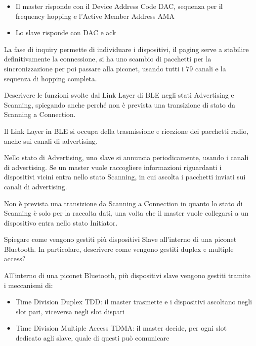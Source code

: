 \begin{questions}
\begin{solution}
\begin{itemize}
            \item Il master risponde con il Device Address Code DAC, sequenza per il frequency hopping e l'Active Member Address AMA
            
            \item Lo slave risponde con DAC e ack
        \end{itemize}
        
        La fase di inquiry permette di individuare i dispositivi, il paging serve a stabilire definitivamente la connessione, si ha uno scambio di pacchetti per la sincronizzazione per poi passare alla piconet, usando tutti i 79 canali e la sequenza di hopping completa.
    \end{solution}
    
    \question Descrivere le funzioni svolte dal Link Layer di BLE negli stati Advertising e Scanning, spiegando anche perché non è prevista una transizione di stato da Scanning a Connection.
    
    \begin{solution}
        Il Link Layer in BLE si occupa della trasmissione e ricezione dei pacchetti radio, anche sui canali di advertising.
        
        Nello stato di Advertising, uno slave si annuncia periodicamente, usando i canali di advertising. Se un master vuole raccogliere informazioni riguardanti i dispositivi vicini entra nello stato Scanning, in cui ascolta i pacchetti inviati sui canali di advertising.
        
        Non è prevista una transizione da Scanning a Connection in quanto lo stato di Scanning è solo per la raccolta dati, una volta che il master vuole collegarsi a un dispositivo entra nello stato Initiator.
    \end{solution}
    
    \question Spiegare come vengono gestiti più dispositivi Slave all'interno di una piconet Bluetooth. In particolare, descrivere come vengono gestiti duplex e multiple access?
    
    \begin{solution}
        All'interno di una piconet Bluetooth, più dispositivi slave vengono gestiti tramite i meccanismi di: 
        \begin{itemize}
            \item Time Division Duplex TDD: il master trasmette e i dispositivi ascoltano negli slot pari, viceversa negli slot dispari
            
            \item Time Division Multiple Access TDMA: il master decide, per ogni slot dedicato agli slave, quale di questi può comunicare
        \end{itemize}
    \end{solution}
    

\end{questions}
